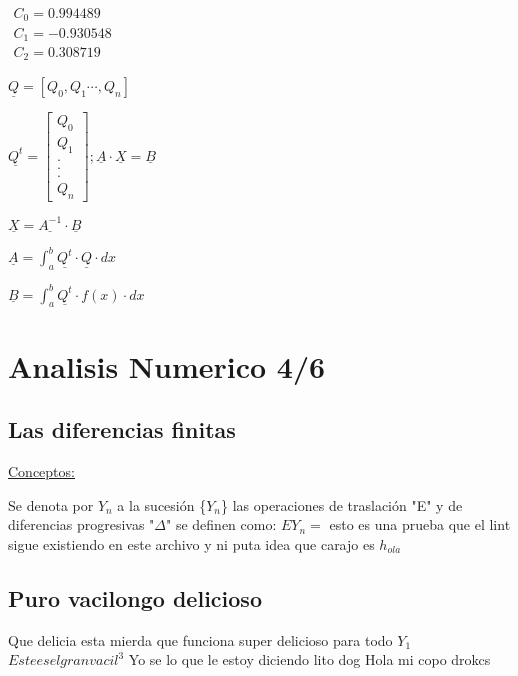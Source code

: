 \documentclass[12pt]{article}
\begin{document}
$\displaystyle \begin{array}{c}
C_0=0.994489\\
C_1=-0.930548\\
C_2=0.308719\
\end{array}$

$\displaystyle \underline{Q}=[Q_0,Q_1\cdots , Q_n]$

$\displaystyle \underline{Q^t} = \left[
\begin{array}{c}
Q_0 \\
Q_1 \\ 
. \\
.\\
.\\
Q_n
\end{array}
\right]; \underline{A} \cdot \underline{X}= \underline{B}$

$\displaystyle \underline{X} =\underline{A^{-1}}\cdot \underline{B}$

$\displaystyle \underline{A}=\int_{a}^{b}{\underline{Q^t}\cdot \underline{Q} \cdot dx}$

$\displaystyle \underline{B}=\int_{a}^{b}{\underline{Q^t}\cdot f(x) \cdot dx}$

\newpage
\section*{Analisis Numerico 4/6}
\subsection*{Las diferencias finitas}

\underline{Conceptos:}

Se denota por $Y_n$ a la sucesión \{$Y_n$\} las operaciones de traslación "E" y de diferencias progresivas "$\Delta$" se definen como: 
$EY_n=$
esto es una prueba que el lint sigue existiendo en este archivo y ni puta idea que carajo es $h_{ola}$
\subsection{Puro vacilongo delicioso}
  Que delicia esta mierda que funciona super delicioso para todo
  $Y_1$
  $Este es el gran vacil^3$
  Yo se lo que le estoy diciendo lito dog
  Hola mi copo drokcs
\end{document}
